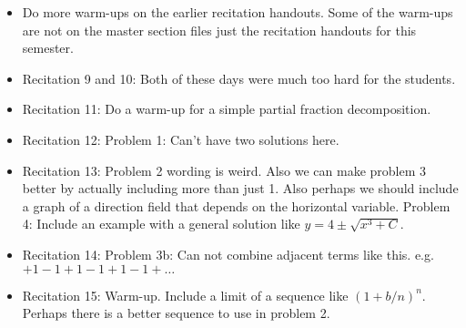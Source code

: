 \documentclass{article}
\begin{document}
\large

\begin{itemize}
\item Do more warm-ups on the earlier recitation handouts. Some of the warm-ups are not on the master section files just the recitation handouts for this semester. 
\item Recitation 9 and 10: Both of these days were much too hard for the students. 
\item Recitation 11: Do a warm-up for a simple partial fraction decomposition.
\item Recitation 12: Problem 1: Can't have two solutions here.
\item Recitation 13: Problem 2 wording is weird. Also we can make problem 3 better by actually including more than just 1. Also perhaps we should include a graph of a direction field that depends on the horizontal variable. Problem 4: Include an example with a general solution like $y=4\pm \sqrt{x^3+C}$. 
\item Recitation 14: Problem 3b: Can not combine adjacent terms like this. e.g. $+1-1+1-1+1-1+\ldots$
\item Recitation 15: Warm-up. Include a limit of a sequence like $(1+b/n)^n$. Perhaps there is a better sequence to use in problem 2. 
\end{itemize}
\end{document}
